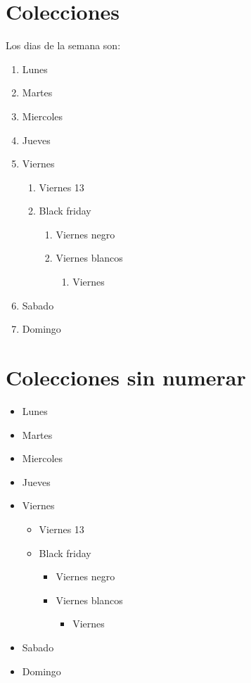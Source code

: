 \documentclass[10pt,a4paper]{article}
\begin{document}
	\section{Colecciones}
		Los dias de la semana son: 
		\begin{enumerate}
			\item Lunes
			\item Martes
			\item Miercoles
			\item Jueves
			\item Viernes
				\begin{enumerate}
					\item Viernes 13
					\item Black friday
						\begin{enumerate}
							\item Viernes negro
							\item Viernes blancos
								\begin{enumerate}
								 	\item Viernes 
								\end{enumerate}
						\end{enumerate}
				\end{enumerate}
			\item Sabado
			\item Domingo
		\end{enumerate}
	\section{Colecciones sin numerar}
		\begin{itemize}
			\item Lunes
			\item Martes
			\item Miercoles
			\item Jueves
			\item Viernes
				\begin{itemize}
					\item Viernes 13
					\item Black friday
						\begin{itemize}
							\item Viernes negro
							\item Viernes blancos
								\begin{itemize}
								 	\item Viernes 
								\end{itemize}
						\end{itemize}
				\end{itemize}
			\item Sabado
			\item Domingo
		\end{itemize}
\end{document}
